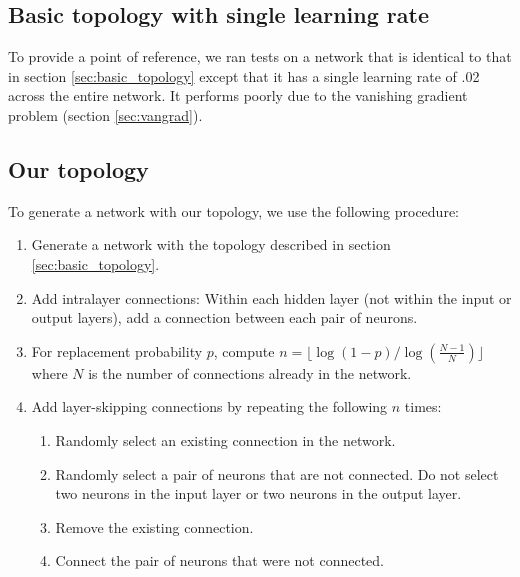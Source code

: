\documentclass[format=sigconf]{acmart}
\begin{document}
\subsection{Basic topology with single learning rate}
\label{sec:basic_topology_uniform}

To provide a point of reference, we ran tests on a network that is identical to that in section \ref{sec:basic_topology} except that it has a single learning rate of .02 across the entire network. It performs poorly due to the vanishing gradient problem (section \ref{sec:vangrad}).

\subsection{Our topology}
\label{sec:our_topology}

To generate a network with our topology, we use the following procedure:

\begin{enumerate}
\item Generate a network with the topology described in section \ref{sec:basic_topology}.
\item Add intralayer connections: Within each hidden layer (not within the input or output layers), add a connection between each pair of neurons.
\item For replacement probability $p$, compute $n=\lfloor \log(1-p)/\log(\frac{N-1}{N})\rfloor$ where $N$ is the number of connections already in the network.
\item Add layer-skipping connections by repeating the following $n$ times:
\begin{enumerate}
\item Randomly select an existing connection in the network.
\item Randomly select a pair of neurons that are not connected. Do not select two neurons in the input layer or two neurons in the output layer.
\item Remove the existing connection.
\item Connect the pair of neurons that were not connected.
\end{enumerate}

\end{enumerate}
\end{document}
